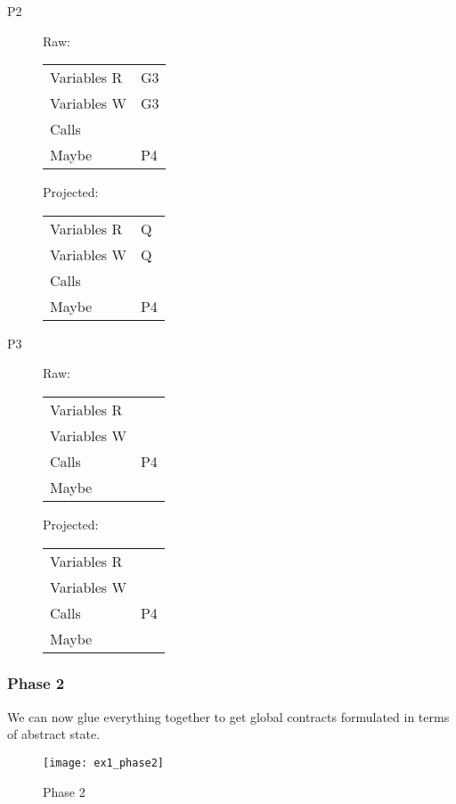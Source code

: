\documentclass{article}
\begin{document}
\begin{description}
\item[P2]
  \begin{multicols}{2}
    Raw:
    \begin{tabular}{ll}
      Variables R & G3 \\
      Variables W & G3 \\
      Calls       & \\
      Maybe       & P4 \\
    \end{tabular}

    Projected:
    \begin{tabular}{ll}
      Variables R & Q \\
      Variables W & Q \\
      Calls       & \\
      Maybe       & P4 \\
    \end{tabular}
  \end{multicols}

\item[P3]
  \begin{multicols}{2}
    Raw:
    \begin{tabular}{ll}
      Variables R & \\
      Variables W & \\
      Calls       & P4 \\
      Maybe       & \\
    \end{tabular}

    Projected:
    \begin{tabular}{ll}
      Variables R & \\
      Variables W & \\
      Calls       & P4 \\
      Maybe       & \\
    \end{tabular}
  \end{multicols}

\end{description}

\pagebreak
\subsubsection{Phase 2}
We can now glue everything together to get global contracts formulated in
terms of abstract state.

\begin{figure}[h]
  \begin{center}
    \texttt{[image: ex1\_phase2]}
  \end{center}
  \caption{Phase 2}
\end{figure}
\end{document}
